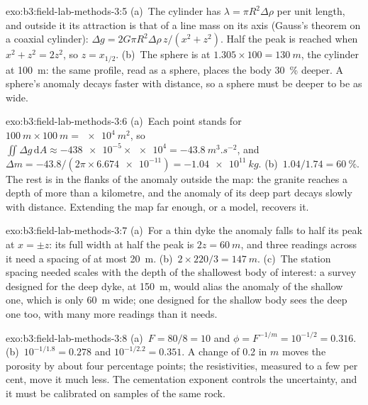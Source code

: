 \begin{solution}{exo:b3:field-lab-methods-3:5}
(a)~The cylinder has $\lambda = \pi R^2\Delta\rho$ per unit length, and
outside it its attraction is that of a line mass on its axis (Gauss's
theorem on a coaxial cylinder): $\Delta g = 2G\pi R^2\Delta\rho\,z/(x^2
+ z^2)$. Half the peak is reached when $x^2 + z^2 = 2z^2$, so $z =
x_{1/2}$. (b)~The sphere is at $1.305\times100 = \qty{130}{m}$, the
cylinder at \qty{100}{m}: the same profile, read as a sphere, places the
body \qty{30}{\percent} deeper. A sphere's anomaly decays faster with
distance, so a sphere must be deeper to be as wide.
\end{solution}

\begin{solution}{exo:b3:field-lab-methods-3:6}
(a)~Each point stands for $\qty{100}{m}\times\qty{100}{m} =
\qty{e4}{m^2}$, so $\iint\Delta g\,\mathrm{d}A \approx
\num{-438e-5}\times\num{e4} = \qty{-43.8}{m^3.s^{-2}}$, and $\Delta m
= -43.8/(2\pi\times\num{6.674e-11}) = \qty{-1.04e11}{kg}$. (b)~$1.04/1.74
= \qty{60}{\percent}$. The rest is in the flanks of the anomaly outside
the map: the granite reaches a depth of more than a kilometre, and the
anomaly of its deep part decays slowly with distance. Extending the map
far enough, or a model, recovers it.
\end{solution}

\begin{solution}{exo:b3:field-lab-methods-3:7}
(a)~For a thin dyke the anomaly falls to half its peak at $x = \pm z$:
its full width at half the peak is $2z = \qty{60}{m}$, and three
readings across it need a spacing of at most \qty{20}{m}. (b)~$2\times
220/3 = \qty{147}{m}$. (c)~The station spacing needed scales with the
depth of the shallowest body of interest: a survey designed for the deep
dyke, at \qty{150}{m}, would alias the anomaly of the shallow one, which
is only \qty{60}{m} wide; one designed for the shallow body sees the
deep one too, with many more readings than it needs.
\end{solution}

\begin{solution}{exo:b3:field-lab-methods-3:8}
(a)~$F = 80/8 = 10$ and $\phi = F^{-1/m} = 10^{-1/2} = \num{0.316}$.
(b)~$10^{-1/1.8} = \num{0.278}$ and $10^{-1/2.2} = \num{0.351}$. A change
of \num{0.2} in $m$ moves the porosity by about four percentage points;
the resistivities, measured to a few per cent, move it much less. The
cementation exponent controls the uncertainty, and it must be calibrated
on samples of the same rock.
\end{solution}

